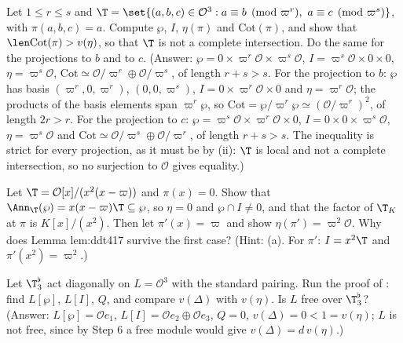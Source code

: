 \begin{exercise}\label{ex:congruence:ex-three-forms}
Let $1\le r\le s$ and $\T=\set{(a,b,c)\in\mathcal O^3:a\equiv b\pmod{\varpi^r},\ a\equiv c\pmod{\varpi^s}}$, with $\pi(a,b,c)=a$. Compute $\wp$, $I$, $\eta(\pi)$ and $\mathrm{Cot}(\pi)$, and show that $\len\mathrm{Cot}(\pi)>v(\eta)$, so that
$\T$ is not a complete intersection. Do the same for the projections to $b$ and to $c$. (Answer: $\wp=0\times\varpi^r\mathcal O\times\varpi^s\mathcal O$, $I=\varpi^s\mathcal O\times0\times0$, $\eta=\varpi^s\mathcal O$,
$\mathrm{Cot}\simeq\mathcal O/\varpi^r\oplus\mathcal O/\varpi^s$, of length $r+s>s$. For the projection to $b$: $\wp$ has basis $(\varpi^r,0,\varpi^r)$, $(0,0,\varpi^s)$, $I=0\times\varpi^r\mathcal O\times0$ and
$\eta=\varpi^r\mathcal O$; the products of the basis elements span $\varpi^r\wp$, so $\mathrm{Cot}=\wp/\varpi^r\wp\simeq(\mathcal O/\varpi^r)^2$, of length $2r>r$. For the projection to $c$: $\wp=\varpi^s\mathcal O\times\varpi^r\mathcal O\times0$,
$I=0\times0\times\varpi^s\mathcal O$, $\eta=\varpi^s\mathcal O$ and $\mathrm{Cot}\simeq\mathcal O/\varpi^s\oplus\mathcal O/\varpi^r$, of length $r+s>s$. The inequality is strict for every projection, as it must be by
(ii): $\T$ is local and not a complete intersection, so no surjection to $\mathcal O$ gives equality.)
\end{exercise}

\begin{exercise}\label{ex:congruence:ex-wp-cap-I}
Let $\T=\mathcal O[x]/(x^2(x-\varpi))$ and $\pi(x)=0$. Show that $\Ann_\T(\wp)=x(x-\varpi)\T\subseteq\wp$, so $\eta=0$ and $\wp\cap I\ne0$, and that the factor of $\T_K$ at $\pi$ is $K[x]/(x^2)$. Then let $\pi'(x)=\varpi$ and
show $\eta(\pi')=\varpi^2\mathcal O$. Why does Lemma lem:ddt417 survive the first case? (Hint: (a). For $\pi'$: $I=x^2\T$ and $\pi'(x^2)=\varpi^2$.)
\end{exercise}

\begin{exercise}\label{ex:congruence:ex-ddt-diag}
Let $\T_3^\flat$ act diagonally on $L=\mathcal O^3$ with the standard pairing. Run the proof of : find $L[\wp]$, $L[I]$, $Q$, and compare $v(\Delta)$ with $v(\eta)$. Is $L$ free over $\T_3^\flat$? (Answer: $L[\wp]=\mathcal Oe_1$, $L[I]=\mathcal Oe_2\oplus\mathcal Oe_3$, $Q=0$,
$v(\Delta)=0<1=v(\eta)$; $L$ is not free, since by Step 6 a free module would give $v(\Delta)=d\,v(\eta)$.)
\end{exercise}

